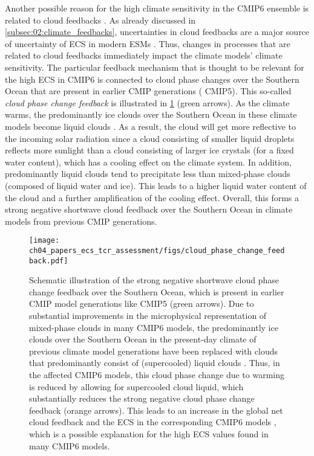 Another possible reason for the high climate sensitivity in the \acs{CMIP}6
ensemble is related to cloud feedbacks \autocite{Bock2020}. As already
discussed in \cref{subsec:02:climate_feedbacks}, uncertainties in cloud
feedbacks are a major source of uncertainty of \ac{ECS} in modern \acp{ESM}
\autocite{Boucher2013, Flato2013}. Thus, changes in processes that are related
to cloud feedbacks immediately impact the climate models' climate sensitivity.
The particular feedback mechanism that is thought to be relevant for the high
\ac{ECS} in \acs{CMIP}6 is connected to cloud phase changes over the Southern
Ocean that are present in earlier \ac{CMIP} generations (\eg{} \acs{CMIP}5).
This so-called \emph{cloud phase change feedback} is illustrated in
\cref{fig:04:cloud_phase_change_feedback} (green arrows). As the climate warms,
the predominantly ice clouds over the Southern Ocean in these climate models
become liquid clouds \autocite{McCoy2015}. As a result, the cloud will get more
reflective to the incoming solar radiation since a cloud consisting of smaller
liquid droplets reflects more sunlight than a cloud consisting of larger ice
crystals (for a fixed water content), which has a cooling effect on the climate
system. In addition, predominantly liquid clouds tend to precipitate less than
mixed-phase clouds (composed of liquid water and ice). This leads to a higher
liquid water content of the cloud and a further amplification of the cooling
effect. Overall, this forms a strong negative shortwave cloud feedback over the
Southern Ocean in climate models from previous \ac{CMIP} generations.

\begin{figure}[t]
  \centering
  \texttt{[image: 
    ch04\_papers\_ecs\_tcr\_assessment/figs/cloud\_phase\_change\_feedback.pdf]}
  \caption[
    Schematic illustration of the strong negative shortwave cloud phase change
    feedback over the Southern Ocean.
  ]{
    Schematic illustration of the strong negative shortwave cloud phase change
    feedback over the Southern Ocean, which is present in earlier \acs{CMIP}
    model generations like \acs{CMIP}5 (green arrows). Due to substantial
    improvements in the microphysical representation of mixed-phase clouds in
    many \acs{CMIP}6 models, the predominantly ice clouds over the Southern
    Ocean in the present-day climate of previous climate model generations have
    been replaced with clouds that predominantly consist of (supercooled)
    liquid clouds \autocite{BodasSalcedo2019, Gettelman2019, Mulcahy2020,
      Williams2020}. Thus, in the affected \acs{CMIP}6 models, this cloud phase
    change due to warming is reduced by allowing for supercooled cloud liquid,
    which substantially reduces the strong negative cloud phase change feedback
    (orange arrows). This leads to an increase in the global net cloud feedback
    \autocite{BodasSalcedo2019, Tan2016} and the \acf{ECS} in the corresponding
    \acs{CMIP}6 models \autocite{Andrews2019, Gettelman2019}, which is a
    possible explanation for the high \acs{ECS} values found in many
    \acs{CMIP}6 models.
  }
  \label{fig:04:cloud_phase_change_feedback}
\end{figure}

